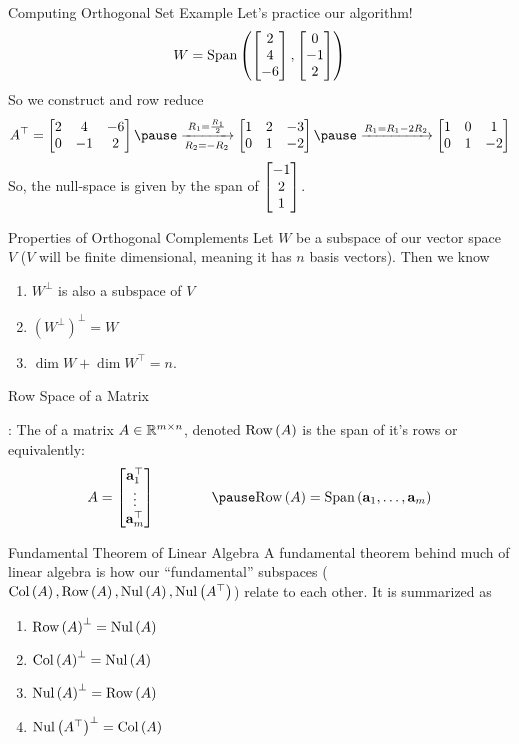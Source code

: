 \documentclass[xcoler=dvipsnames, aspectratio=169]{beamer}
\begin{document}
    \begin{frame}{Computing Orthogonal Set Example}
        Let's practice our algorithm!
        \[
            W=\text{Span}\left(\begin{bmatrix}2\\4\\-6\end{bmatrix}, \begin{bmatrix}0\\-1\\2\end{bmatrix}\right)
        \]
        So we construct and row reduce
        \[
            A^\top = \bMat{
                2 & 4 & -6\\
                0 & -1&  2
            }\pause\xrightarrow[R_2=-R_2]{R_1=\frac{R_1}{2}}\bMat{
                1 & 2 & -3\\
                0 & 1 & -2
            }\pause\xrightarrow{R_1 = R_1-2R_2}\bMat{
                1 & 0 &  1\\
                0 & 1 & -2
            }
        \]
        So, the null-space is given by the span of $\begin{bmatrix}-1\\2\\1\end{bmatrix}$.
    \end{frame}
    \begin{frame}{Properties of Orthogonal Complements}
        Let $W$ be a subspace of our vector space $V$ ($V$ will be finite dimensional, meaning it 
        has $n$ basis vectors). Then we know
        \begin{enumerate}
            \pause\item $W^\perp$ is also a subspace of $V$
            \pause\item $\left(W^\perp\right)^\perp = W$
            \pause\item $\dim{W} + \dim{W^\top} = n$.
        \end{enumerate}
    \end{frame}
    \begin{frame}{Row Space of a Matrix}
        \begin{defn}
            : The  of a matrix $A\in\mathbb{R}^{m\times n}$, 
            denoted $\mathrm{Row}\left(A\right)$ is the span of it's rows or equivalently:\pause
            \[
                A = \bMat{
                    \vec{a}_1^\top\\
                    \vdots\\
                    \vec{a}_m^\top
                }\qquad\qquad\pause\rowS{A} = \Span{\vec{a}_1, \dots, \vec{a}_m}
            \]
        \end{defn}
    \end{frame}
    \begin{frame}{Fundamental Theorem of Linear Algebra}
        A fundamental theorem behind much of linear algebra is how our ``fundamental'' subspaces 
        ($\mathrm{Col}\left(A\right),\mathrm{Row}\left(A\right),\mathrm{Nul}\left(A\right),\mathrm{Nul}\left(A^\top\right)$) relate to each other. It is summarized as
        \begin{enumerate}
            \pause\item $\mathrm{Row}\left(A\right)^\perp = \mathrm{Nul}\left(A\right)$
            \pause\item $\mathrm{Col}\left(A\right)^\perp = \mathrm{Nul}\left(A\right)$
            \pause\item $\mathrm{Nul}\left(A\right)^\perp = \mathrm{Row}\left(A\right)$
            \pause\item $\mathrm{Nul}\left(A^\top\right)^\perp = \mathrm{Col}\left(A\right)$
        \end{enumerate}
    \end{frame}
\end{document}
